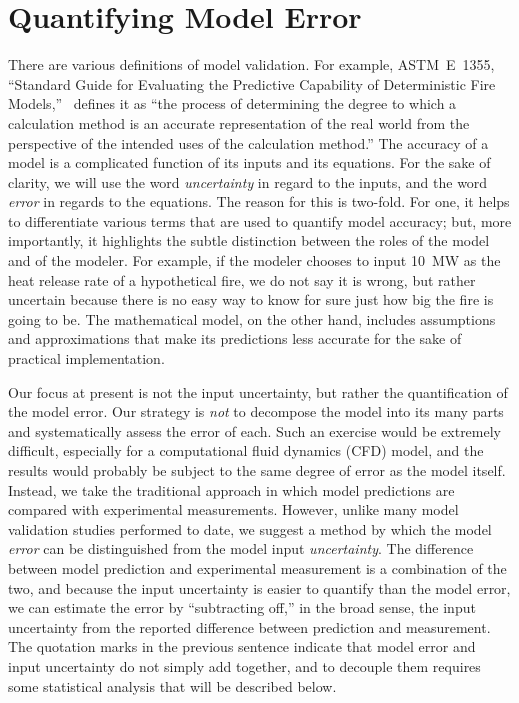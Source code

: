 
\chapter{Quantifying Model Error}

There are various definitions of model validation.
For example, ASTM~E~1355, ``Standard Guide for Evaluating the Predictive Capability of
Deterministic Fire Models,''~\cite{ASTM:E1355} defines it as ``the process of determining the degree to which a calculation method
is an accurate representation of the real world from the perspective of the intended uses of the calculation method.''
The accuracy of a model is a complicated function of its inputs and its equations.
For the sake of clarity, we will use the word {\em uncertainty} in regard to the inputs, and the word {\em error} in regards
to the equations. The reason for this is two-fold. For one,
it helps to differentiate various terms that are used to quantify model accuracy; but, more importantly, it highlights the subtle distinction between the roles of the model
and of the modeler. For example, if the modeler chooses to input 10~MW as the heat release rate of a hypothetical fire, we do not say it is wrong, but rather uncertain because there
is no easy way to know for sure just how big the fire is going to be. The mathematical model, on the other hand, includes assumptions and approximations that make its predictions less
accurate for the sake of practical implementation.

Our focus at present is not the input uncertainty, but rather the quantification of the model error.
Our strategy is {\em not} to decompose the model into its many parts and systematically assess
the error of each. Such an exercise would be extremely difficult, especially for a computational fluid dynamics (CFD) model, and the results would probably be subject to the same
degree of error as the model itself. Instead, we take the traditional approach in which model predictions are compared with experimental measurements. However, unlike many
model validation studies performed to date, we suggest a method by which the model {\em error} can be distinguished from the model input {\em uncertainty}. The difference
between model prediction and experimental measurement is a combination of the two, and because the input
uncertainty is easier to quantify than the model error, we can estimate the error by ``subtracting off,'' in the broad sense, the input uncertainty from the reported
difference between prediction and measurement. The quotation marks in the previous sentence indicate that model error and input uncertainty do not simply add together,
and to decouple them requires some statistical analysis that will be described below.


